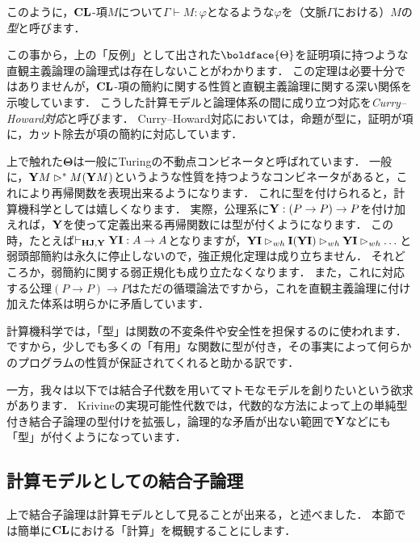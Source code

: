 \documentclass[realisability.tex]{subfiles}
\begin{document}
このように，$\mathord{\mathbf{CL}}$-項$M$について$\Gamma \vdash M: \varphi$となるような$\varphi$を（文脈$\Gamma$における）$M$の\emph{型}と呼びます．

この事から，上の「反例」として出された$\boldface{\Theta}$を証明項に持つような直観主義論理の論理式は存在しないことがわかります．
この定理は必要十分ではありませんが，$\mathord{\mathbf{CL}}$-項の簡約に関する性質と直観主義論理に関する深い関係を示唆しています．
こうした計算モデルと論理体系の間に成り立つ対応を\emph{Curry--Howard対応}と呼びます．
Curry--Howard対応においては，命題が型に，証明が項に，カット除去が項の簡約に対応しています．

\begin{remark}[理論計算機科学からの注意]
 上で触れた$\boldsymbol{\Theta}$は一般にTuringの不動点コンビネータと呼ばれています．
 一般に，$\mathsf{\mathbf{Y}} M \rhd^* M (\mathsf{\mathbf{Y}} M)$というような性質を持つようなコンビネータがあると，これにより再帰関数を表現出来るようになります．
 これに型を付けられると，計算機科学としては嬉しくなります．
 実際，公理系に$\mathsf{\mathbf{Y}}: (P \to P) \to P$を付け加えれば，$\mathsf{\mathbf{Y}}$を使って定義出来る再帰関数には型が付くようになります．
 この時，たとえば$\vdash_{\mathord{\mathbf{HJ}}, \mathsf{\mathbf{Y}}} \mathsf{\mathbf{Y}}\mathsf{\mathbf{I}}: A \to A$となりますが，$\mathsf{\mathbf{Y}} \mathsf{\mathbf{I}} \rhd_{wh} \mathsf{\mathbf{I}} (\mathsf{\mathbf{Y}} \mathsf{\mathbf{I}}) \rhd_{wh} \mathsf{\mathbf{Y}} \mathsf{\mathbf{I}} \rhd_{wh} \dots$と弱頭部簡約は永久に停止しないので，強正規化定理は成り立ちません．
 それどころか，弱簡約に関する弱正規化も成り立たなくなります．
 また，これに対応する公理$(P \to P) \to P$はただの循環論法ですから，これを直観主義論理に付け加えた体系は明らかに矛盾しています．

 計算機科学では，「型」は関数の不変条件や安全性を担保するのに使われます．
 ですから，少しでも多くの「有用」な関数に型が付き，その事実によって何らかのプログラムの性質が保証されてくれると助かる訳です\footnotemark．

 一方，我々は以下では結合子代数を用いてマトモなモデルを創りたいという欲求があります．
 Krivineの実現可能性代数では，代数的な方法によって上の単純型付き結合子論理の型付けを拡張し，論理的な矛盾が出ない範囲で$\mathsf{\mathbf{Y}}$などにも「型」が付くようになっています．
\end{remark}

\subsection{計算モデルとしての結合子論理}
上で結合子論理は計算モデルとして見ることが出来る，と述べました．
本節では簡単に$\mathord{\mathbf{CL}}$における「計算」を概観することにします．
\end{document}
